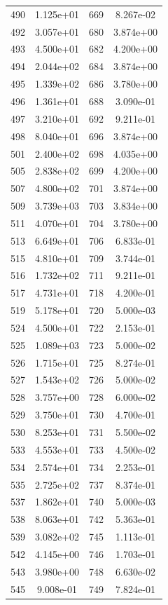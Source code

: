 \documentclass[12pt]{article}
\begin{document}
\begin{longtable}{@{}cccc@{}}
490 & 1.125e+01 & 669 & 8.267e-02 \\
492 & 3.057e+01 & 680 & 3.874e+00 \\
493 & 4.500e+01 & 682 & 4.200e+00 \\
494 & 2.044e+02 & 684 & 3.874e+00 \\
495 & 1.339e+02 & 686 & 3.780e+00 \\
496 & 1.361e+01 & 688 & 3.090e-01 \\
497 & 3.210e+01 & 692 & 9.211e-01 \\
498 & 8.040e+01 & 696 & 3.874e+00 \\
501 & 2.400e+02 & 698 & 4.035e+00 \\
505 & 2.838e+02 & 699 & 4.200e+00 \\
507 & 4.800e+02 & 701 & 3.874e+00 \\
509 & 3.739e+03 & 703 & 3.834e+00 \\
511 & 4.070e+01 & 704 & 3.780e+00 \\
513 & 6.649e+01 & 706 & 6.833e-01 \\
515 & 4.810e+01 & 709 & 3.744e-01 \\
516 & 1.732e+02 & 711 & 9.211e-01 \\
517 & 4.731e+01 & 718 & 4.200e-01 \\
519 & 5.178e+01 & 720 & 5.000e-03 \\
524 & 4.500e+01 & 722 & 2.153e-01 \\
525 & 1.089e+03 & 723 & 5.000e-02 \\
526 & 1.715e+01 & 725 & 8.274e-01 \\
527 & 1.543e+02 & 726 & 5.000e-02 \\
528 & 3.757e+00 & 728 & 6.000e-02 \\
529 & 3.750e+01 & 730 & 4.700e-01 \\
530 & 8.253e+01 & 731 & 5.500e-02 \\
533 & 4.553e+01 & 733 & 4.500e-02 \\
534 & 2.574e+01 & 734 & 2.253e-01 \\
535 & 2.725e+02 & 737 & 8.374e-01 \\
537 & 1.862e+01 & 740 & 5.000e-03 \\
538 & 8.063e+01 & 742 & 5.363e-01 \\
539 & 3.082e+02 & 745 & 1.113e-01 \\
542 & 4.145e+00 & 746 & 1.703e-01 \\
543 & 3.980e+00 & 748 & 6.630e-02 \\
545 & 9.008e-01 & 749 & 7.824e-01 \\

\end{longtable}
\end{document}

